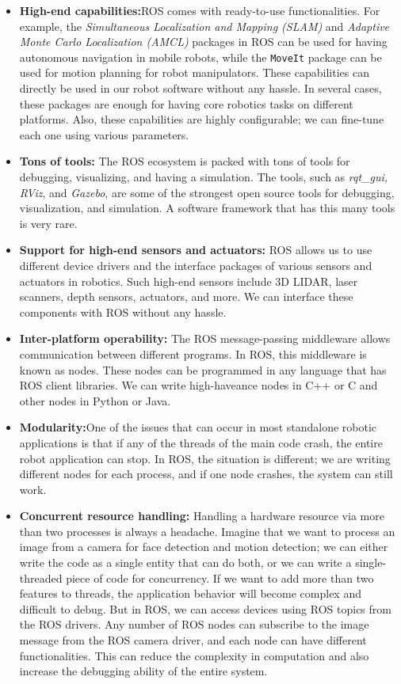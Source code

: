 \documentclass[../../main]{subfiles}
\begin{document}
\begin{itemize}
\item \textbf{High-end capabilities:}ROS comes with ready-to-use functionalities. For example,
    the \emph{Simultaneous Localization and Mapping (SLAM)} and \emph{Adaptive Monte
    Carlo Localization (AMCL)} packages in ROS can be used for having autonomous
    navigation in mobile robots, while the \lstinline!MoveIt! package can be used for motion
    planning for robot manipulators. These capabilities can directly be used in our
    robot software without any hassle. In several cases, these packages are enough for
    having core robotics tasks on different platforms. Also, these capabilities are highly
    configurable; we can fine-tune each one using various parameters.
\item \textbf{Tons of tools:} The ROS ecosystem is packed with tons of tools for debugging,
    visualizing, and having a simulation. The tools, such as \emph{rqt\_gui, RViz}, and \emph{Gazebo},
    are some of the strongest open source tools for debugging, visualization, and
    simulation. A software framework that has this many tools is very rare.
\item \textbf{Support for high-end sensors and actuators:} ROS allows us to use different device
    drivers and the interface packages of various sensors and actuators in robotics. Such
    high-end sensors include 3D LIDAR, laser scanners, depth sensors, actuators, and
    more. We can interface these components with ROS without any hassle.
\item \textbf{Inter-platform operability:} The ROS message-passing middleware allows
    communication between different programs. In ROS, this middleware is known
    as nodes. These nodes can be programmed in any language that has ROS client
    libraries. We can write high-haveance nodes in C++ or C and other nodes in Python
    or Java.
\item \textbf{Modularity:}One of the issues that can occur in most standalone robotic
    applications is that if any of the threads of the main code crash, the entire robot
    application can stop. In ROS, the situation is different; we are writing different
    nodes for each process, and if one node crashes, the system can still work.
\item \textbf{Concurrent resource handling:} Handling a hardware resource via more than two
processes is always a headache. Imagine that we want to process an image from a
camera for face detection and motion detection; we can either write the code as a
single entity that can do both, or we can write a single-threaded piece of code for
concurrency. If we want to add more than two features to threads, the application
behavior will become complex and difficult to debug. But in ROS, we can access
devices using ROS topics from the ROS drivers. Any number of ROS nodes can
subscribe to the image message from the ROS camera driver, and each node can
have different functionalities. This can reduce the complexity in computation and
also increase the debugging ability of the entire system.
\end{itemize}
\end{document}
